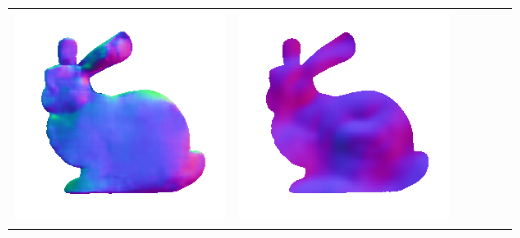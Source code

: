 \begin{tabularx}{\linewidth}{@{}Y@{}Y@{}Y@{}Y@{}Y@{}Y@{}}
\includegraphics[width=\linewidth]{semisynthetic/20160617_14_marrnet_out.png} &
\includegraphics[width=\linewidth]{semisynthetic/20160617_14_ef_out.png} \\

\end{tabularx}
